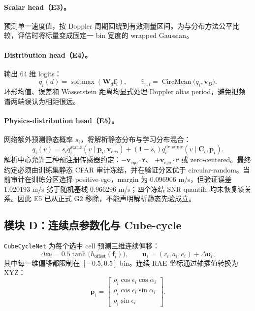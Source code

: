 \documentclass[11pt,a4paper,fontset=none]{ctexart}
\newcommand{\code}[1]{\texttt{#1}}
\begin{document}
\paragraph{Scalar head（E3）。}
预测单一速度值，按 Doppler 周期回绕到有效测量区间。为与分布方法公平比较，评估时将标量变成固定一 bin 宽度的 wrapped Gaussian。

\paragraph{Distribution head（E4）。}
输出 64 维 logits：
\begin{equation}
  q_i(d)=\operatorname{softmax}(\mathbf{W}_{d}\mathbf{f}_i),
  \qquad
  \hat v_{r,i}=\operatorname{CircMean}\bigl(q_i,\mathbf{v}_{D}\bigr).
\end{equation}
环形均值、误差和 Wasserstein 距离均显式处理 Doppler alias period，避免把频谱两端误认为相距很远。

\paragraph{Physics-distribution head（E5）。}
网络额外预测静态概率 $s_i$，将解析静态分布与学习分布混合：
\begin{equation}
  q_i(v)=s_i q_i^{\mathrm{static}}(v\mid \mathbf{p}_i,\mathbf{v}_{ego})
  +(1-s_i)q_i^{\mathrm{dynamic}}(v\mid \mathbf{C}_t,\mathbf{p}_i).
\end{equation}
解析中心允许三种预注册传感器约定：$-\mathbf{v}_{ego}\cdot\hat{\mathbf r}$、
$+\mathbf{v}_{ego}\cdot\hat{\mathbf r}$ 或 zero-centered。最终约定必须由训练集静态 CFAR 审计冻结，并在验证分区优于 circular-random。当前审计在训练分区选择 positive-ego，margin 为 $0.096906$ m/s，但验证误差 $1.020193$ m/s 劣于随机基线 $0.966296$ m/s；四个冻结 SNR quantile 均未恢复该关系。因此 E5 已从正式 G2 移除，不能声明解析静态先验成立。

\subsection{模块 D：连续点参数化与 Cube-cycle}

\code{CubeCycleNet} 为每个选中 cell 预测三维连续偏移：
\begin{equation}
  \Delta\mathbf{u}_i=0.5\tanh\bigl(h_{\mathrm{offset}}(\mathbf f_i)\bigr),
  \qquad
  \mathbf{u}_i=(r_i,a_i,e_i)+\Delta\mathbf{u}_i,
\end{equation}
其中每一维偏移都限制在 $[-0.5,0.5]$ bin。连续 RAE 坐标通过轴插值转换为 XYZ：
\begin{equation}
\mathbf p_i=
\begin{bmatrix}
\rho_i\cos\epsilon_i\cos\alpha_i\\
\rho_i\cos\epsilon_i\sin\alpha_i\\
\rho_i\sin\epsilon_i
\end{bmatrix}.
\end{equation}
\end{document}
